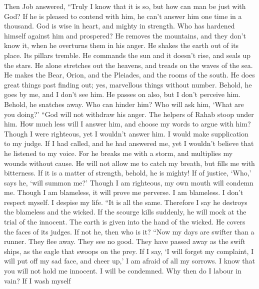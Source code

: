  Then Job answered,  ``Truly I know that it is
so, but how can man be just with God?  If he is pleased to
contend with him, he can't answer him one time in a thousand.
 God is wise in heart, and mighty in strength. Who has
hardened himself against him and prospered?  He removes the
mountains, and they don't know it, when he overturns them in his anger.
 He shakes the earth out of its place. Its pillars tremble.
 He commands the sun and it doesn't rise, and seals up the
stars.  He alone stretches out the heavens, and treads on
the waves of the sea.  He makes the Bear, Orion, and the
Pleiades, and the rooms of the south.  He does great things
past finding out; yes, marvellous things without number. 
Behold, he goes by me, and I don't see him. He passes on also, but I
don't perceive him.  Behold, he snatches away. Who can
hinder him? Who will ask him, `What are you doing?'  ``God
will not withdraw his anger. The helpers of Rahab stoop under him.
 How much less will I answer him, and choose my words to
argue with him?  Though I were righteous, yet I wouldn't
answer him. I would make supplication to my judge.  If I
had called, and he had answered me, yet I wouldn't believe that he
listened to my voice.  For he breaks me with a storm, and
multiplies my wounds without cause.  He will not allow me
to catch my breath, but fills me with bitterness.  If it is
a matter of strength, behold, he is mighty! If of justice, `Who,' says
he, `will summon me?'  Though I am righteous, my own mouth
will condemn me. Though I am blameless, it will prove me perverse.
 I am blameless. I don't respect myself. I despise my life.
 ``It is all the same. Therefore I say he destroys the
blameless and the wicked.  If the scourge kills suddenly,
he will mock at the trial of the innocent.  The earth is
given into the hand of the wicked. He covers the faces of its judges. If
not he, then who is it?  ``Now my days are swifter than a
runner. They flee away. They see no good.  They have passed
away as the swift ships, as the eagle that swoops on the prey.
 If I say, `I will forget my complaint, I will put off my
sad face, and cheer up,'  I am afraid of all my sorrows. I
know that you will not hold me innocent.  I will be
condemned. Why then do I labour in vain?  If I wash myself
